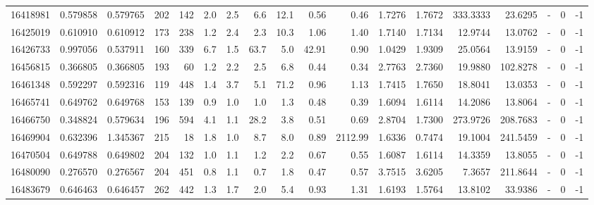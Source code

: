 \begin{tabular}{rrrrrrrrrrrrrrrlrr}
  16418981 & 0.579858 &   0.579765 &  202 &  142 &      2.0 &      2.5 &     6.6 &     12.1 &       0.56 &        0.46 &  1.7276 &  1.7672 &  333.3333 &   23.6295 &             - &        0 &         -1 \\
  16425019 & 0.610910 &   0.610912 &  173 &  238 &      1.2 &      2.4 &     2.3 &     10.3 &       1.06 &        1.40 &  1.7140 &  1.7134 &   12.9744 &   13.0762 &             - &        0 &         -1 \\
  16426733 & 0.997056 &   0.537911 &  160 &  339 &      6.7 &      1.5 &    63.7 &      5.0 &      42.91 &        0.90 &  1.0429 &  1.9309 &   25.0564 &   13.9159 &             - &        0 &         -1 \\
  16456815 & 0.366805 &   0.366805 &  193 &   60 &      1.2 &      2.2 &     2.5 &      6.8 &       0.44 &        0.34 &  2.7763 &  2.7360 &   19.9880 &  102.8278 &             - &        0 &         -1 \\
  16461348 & 0.592297 &   0.592316 &  119 &  448 &      1.4 &      3.7 &     5.1 &     71.2 &       0.96 &        1.13 &  1.7415 &  1.7650 &   18.8041 &   13.0353 &             - &        0 &         -1 \\
  16465741 & 0.649762 &   0.649768 &  153 &  139 &      0.9 &      1.0 &     1.0 &      1.3 &       0.48 &        0.39 &  1.6094 &  1.6114 &   14.2086 &   13.8064 &             - &        0 &         -1 \\
  16466750 & 0.348824 &   0.579634 &  196 &  594 &      4.1 &      1.1 &    28.2 &      3.8 &       0.51 &        0.69 &  2.8704 &  1.7300 &  273.9726 &  208.7683 &             - &        0 &         -1 \\
  16469904 & 0.632396 &   1.345367 &  215 &   18 &      1.8 &      1.0 &     8.7 &      8.0 &       0.89 &     2112.99 &  1.6336 &  0.7474 &   19.1004 &  241.5459 &             - &        0 &         -1 \\
  16470504 & 0.649788 &   0.649802 &  204 &  132 &      1.0 &      1.1 &     1.2 &      2.2 &       0.67 &        0.55 &  1.6087 &  1.6114 &   14.3359 &   13.8055 &             - &        0 &         -1 \\
  16480090 & 0.276570 &   0.276567 &  204 &  451 &      0.8 &      1.1 &     0.7 &      1.8 &       0.47 &        0.57 &  3.7515 &  3.6205 &    7.3657 &  211.8644 &             - &        0 &         -1 \\
  16483679 & 0.646463 &   0.646457 &  262 &  442 &      1.3 &      1.7 &     2.0 &      5.4 &       0.93 &        1.31 &  1.6193 &  1.5764 &   13.8102 &   33.9386 &             - &        0 &         -1 \\

\end{tabular}
